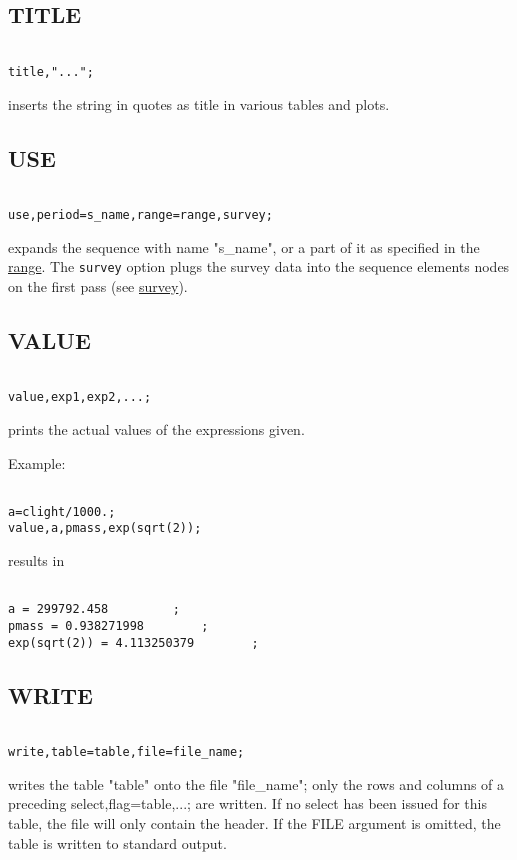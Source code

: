 \subsection{TITLE}
\begin{verbatim}

title,"...";
\end{verbatim} 
inserts the string in quotes as title in various tables and plots.  


\subsection{USE}
\begin{verbatim}

use,period=s_name,range=range,survey;
\end{verbatim} 
expands the sequence with name "s\_name", or a part of it as specified
in the \href{../Introduction/ranges.html#range}{range}. The
\texttt{survey} option plugs the survey data into the sequence elements
nodes on the first pass (see \href{../survey/survey.html}{survey}).  


\subsection{VALUE}
\begin{verbatim}

value,exp1,exp2,...;
\end{verbatim} 
prints the actual values of the expressions given. 

Example: 
\begin{verbatim}

a=clight/1000.;
value,a,pmass,exp(sqrt(2));
\end{verbatim} results in 
\begin{verbatim}

a = 299792.458         ;
pmass = 0.938271998        ;
exp(sqrt(2)) = 4.113250379        ;
\end{verbatim}


\subsection{WRITE}
\begin{verbatim}

write,table=table,file=file_name;
\end{verbatim} 
writes the table "table" onto the file "file\_name"; only the rows and
columns of a preceding select,flag=table,...; are written. If no select
has been issued for this table, the file will only contain the
header. If the FILE argument is omitted, the table is written to
standard output.  



